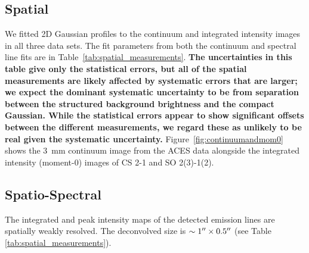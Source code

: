 \documentclass[]{aastex631}
\newcommand{\kms}{\ensuremath{\mathrm{km~s}^{-1}}\xspace}
\newcommand{\threemm}{3~mm\xspace}
\renewcommand{\deg}{\ensuremath{^{\circ}}\xspace}
\def\rr#1{\textbf{#1}}
\begin{document}
\subsection{Spatial}
\label{sec:spatialmeasurements}
We fitted 2D Gaussian profiles to the continuum and integrated intensity images in all three data sets.
The fit parameters from both the continuum and spectral line fits are in Table~\ref{tab:spatial_measurements}.
\rr{The uncertainties in this table give only the statistical errors, but all of the spatial measurements are likely affected by systematic errors that are larger; we expect the dominant systematic uncertainty to be from separation between the structured background brightness and the compact Gaussian.
While the statistical errors appear to show significant offsets between the different measurements, we regard these as unlikely to be real given the systematic uncertainty.
}
Figure~\ref{fig:continuumandmom0} shows the \threemm continuum image from the ACES data alongside the integrated intensity (moment-0) images of CS 2-1 and SO 2(3)-1(2).



\subsection{Spatio-Spectral}
\label{sec:spatio-spectral}
The integrated and peak intensity maps of the detected emission lines are spatially weakly resolved.
The deconvolved size is $\sim1\mbox{$^{\prime\prime}$}\times0.5\mbox{$^{\prime\prime}$}$ (see Table \ref{tab:spatial_measurements}).
\end{document}
